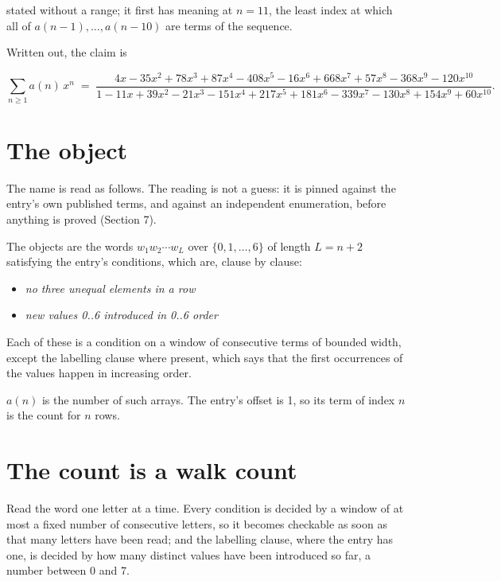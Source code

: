 \documentclass[11pt]{article}
\theoremstyle{definition}
\begin{document}
stated without a range; it first has meaning at $n = 11$, the least index at which all of $a(n-1),\dots,a(n-10)$ are terms of the sequence.

Written out, the claim is

\[\sum_{n \ge 1} a(n)\,x^n \;=\; \frac{4x - 35x^{2} + 78x^{3} + 87x^{4} - 408x^{5} - 16x^{6} + 668x^{7} + 57x^{8} - 368x^{9} - 120x^{10}}{1 - 11x + 39x^{2} - 21x^{3} - 151x^{4} + 217x^{5} + 181x^{6} - 339x^{7} - 130x^{8} + 154x^{9} + 60x^{10}}.\]

\section{The object}

The name is read as follows. The reading is not a guess: it is pinned against the entry's own published terms, and against an independent enumeration, before anything is proved (Section 7).

The objects are the words $w_1 w_2 \cdots w_L$ over $\{0,1,\dots,6\}$ of length $L = n + 2$ satisfying the entry's conditions, which are, clause by clause:

\begin{itemize}

\item {\itshape no three unequal elements in a row}

\item {\itshape new values 0..6 introduced in 0..6 order}

\end{itemize}

Each of these is a condition on a window of consecutive terms of bounded width, except the labelling clause where present, which says that the first occurrences of the values happen in increasing order.

$a(n)$ is the number of such arrays. The entry's offset is 1, so its term of index $n$ is the count for $n$ rows.

\section{The count is a walk count}

Read the word one letter at a time. Every condition is decided by a window of at most a fixed number of consecutive letters, so it becomes checkable as soon as that many letters have been read; and the labelling clause, where the entry has one, is decided by how many distinct values have been introduced so far, a number between $0$ and 7.
\end{document}
